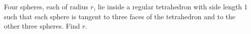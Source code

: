 Four spheres, each of radius $r$, lie inside a regular tetrahedron with side length $1$ such that each sphere is tangent to three faces of the tetrahedron and to the other three spheres. Find $r$.